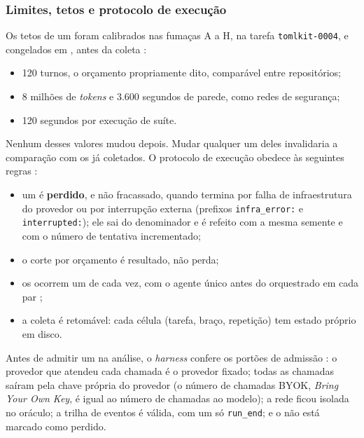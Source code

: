 \subsubsection{Limites, tetos e protocolo de execução}

Os tetos de um  foram calibrados nas fumaças A a H, na tarefa \texttt{tomlkit-0004}, e congelados em , antes da coleta :

\begin{itemize}
    \item 120 turnos, o orçamento propriamente dito, comparável entre repositórios;
    \item 8 milhões de \textit{tokens} e 3.600 segundos de parede, como redes de segurança;
    \item 120 segundos por execução de suíte.
\end{itemize}

Nenhum desses valores mudou depois. Mudar qualquer um deles invalidaria a comparação com os  já coletados. O protocolo de execução obedece às seguintes regras :

\begin{itemize}
    \item um  é \textbf{perdido}, e não fracassado, quando termina por falha de infraestrutura do provedor ou por interrupção externa (prefixos \texttt{infra\_error:} e \texttt{interrupted:}); ele sai do denominador e é refeito com a mesma semente e com o número de tentativa incrementado;
    \item o corte por orçamento é resultado, não perda;
    \item os  ocorrem um de cada vez, com o agente único antes do orquestrado em cada par ;
    \item a coleta é retomável: cada célula (tarefa, braço, repetição) tem estado próprio em disco.
\end{itemize}

Antes de admitir um  na análise, o \textit{harness} confere os portões de admissão : o provedor que atendeu cada chamada é o provedor fixado; todas as chamadas saíram pela chave própria do provedor (o número de chamadas BYOK, \textit{Bring Your Own Key}, é igual ao número de chamadas ao modelo); a rede ficou isolada no oráculo; a trilha de eventos é válida, com um só \texttt{run\_end}; e o  não está marcado como perdido.

